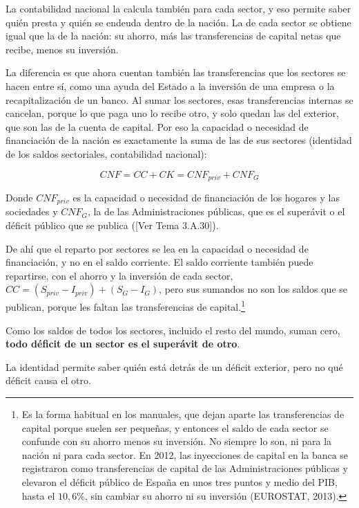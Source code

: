 \documentclass[10pt,a4paper]{article}
\newcommand{\authorfont}[1]{{\fontfamily{EBGaramond-TLF}\selectfont #1}}
\begin{document}
La contabilidad nacional la calcula también para cada sector, y eso permite saber quién presta y quién se endeuda dentro de la nación. La de cada sector se obtiene igual que la de la nación: su ahorro, más las transferencias de capital netas que recibe, menos su inversión.

La diferencia es que ahora cuentan también las transferencias que los sectores se hacen entre sí, como una ayuda del Estado a la inversión de una empresa o la recapitalización de un banco. Al sumar los sectores, esas transferencias internas se cancelan, porque lo que paga uno lo recibe otro, y solo quedan las del exterior, que son las de la cuenta de capital. Por eso la capacidad o necesidad de financiación de la nación es exactamente la suma de las de sus sectores (identidad de los saldos sectoriales, contabilidad nacional):

$$CNF=CC+CK=CNF_{priv}+CNF_G$$

Donde $CNF_{priv}$ es la capacidad o necesidad de financiación de los hogares y las sociedades y $CNF_G$, la de las Administraciones públicas, que es el superávit o el déficit público que se publica ([\authorfont{Ver Tema 3.A.30}]).

De ahí que el reparto por sectores se lea en la capacidad o necesidad de financiación, y no en el saldo corriente. El saldo corriente también puede repartirse, con el ahorro y la inversión de cada sector, $CC=(S_{priv}-I_{priv})+(S_G-I_G)$, pero sus sumandos no son los saldos que se publican, porque les faltan las transferencias de capital.\footnote{%
    Es la forma habitual en los manuales, que dejan aparte las transferencias de capital porque suelen ser pequeñas, y entonces el saldo de cada sector se confunde con su ahorro menos su inversión. No siempre lo son, ni para la nación ni para cada sector. En 2012, las inyecciones de capital en la banca se registraron como transferencias de capital de las Administraciones públicas y elevaron el déficit público de España en unos tres puntos y medio del PIB, hasta el $10{,}6\%$, sin cambiar su ahorro ni su inversión (EUROSTAT, 2013).
}

Como los saldos de todos los sectores, incluido el resto del mundo, suman cero, \textbf{todo déficit de un sector es el superávit de otro}.

La identidad permite saber quién está detrás de un déficit exterior, pero no qué déficit causa el otro. 
\end{document}
